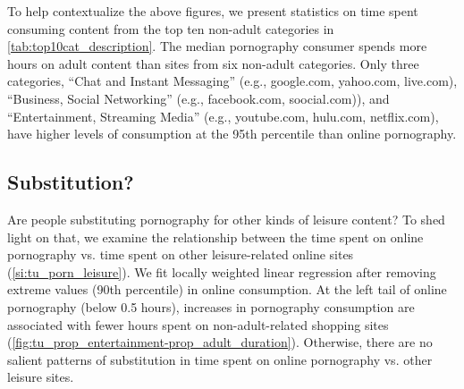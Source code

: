 \documentclass[12pt, letterpaper]{article}
\begin{document}
To help contextualize the above figures, we present statistics on time spent consuming content from the top ten non-adult categories in \cref{tab:top10cat_description}. The median pornography consumer spends more hours on adult content than sites from six non-adult categories. Only three categories, ``Chat and Instant Messaging'' (e.g., google.com, yahoo.com, live.com), ``Business, Social Networking'' (e.g., facebook.com, soocial.com)),  and ``Entertainment, Streaming Media'' (e.g., youtube.com, hulu.com, netflix.com), have higher levels of consumption at the 95th percentile than online pornography.

\subsection{Substitution?}
Are people substituting pornography for other kinds of leisure content? To shed light on that, we examine the relationship between the time spent on online pornography vs. time spent on other leisure-related online sites (\cref{si:tu_porn_leisure}). We fit locally weighted linear regression after removing extreme values (90th percentile) in online consumption. At the left tail of online pornography (below 0.5 hours), increases in pornography consumption are associated with fewer hours spent on non-adult-related shopping sites (\cref{fig:tu_prop_entertainment-prop_adult_duration}). Otherwise, there are no salient patterns of substitution in time spent on online pornography vs. other leisure sites.
\end{document}
